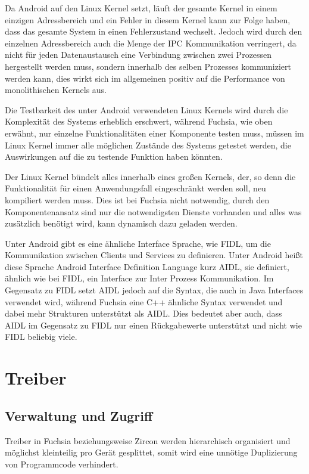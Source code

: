 \documentclass[a4paper]{scrartcl}
\begin{document}
Da Android auf den Linux Kernel setzt, läuft der gesamte Kernel in einem einzigen Adressbereich und ein Fehler in diesem Kernel kann zur Folge haben, dass das gesamte System in einen Fehlerzustand wechselt. Jedoch wird durch den einzelnen Adressbereich auch die Menge der IPC Kommunikation verringert, da nicht für jeden Datenaustausch eine Verbindung zwischen zwei Prozessen hergestellt werden muss, sondern innerhalb des selben Prozesses kommuniziert werden kann, dies wirkt sich im allgemeinen positiv auf die Performance von monolithischen Kernels aus.

Die Testbarkeit des unter Android verwendeten Linux Kernels wird durch die Komplexität des Systems erheblich erschwert, während Fuchsia, wie oben erwähnt, nur einzelne Funktionalitäten einer Komponente testen muss, müssen im Linux Kernel immer alle möglichen Zustände des Systems getestet werden, die Auswirkungen auf die zu testende Funktion haben könnten.

Der Linux Kernel bündelt alles innerhalb eines großen Kernels, der, so denn die Funktionalität für einen Anwendungsfall eingeschränkt werden soll, neu kompiliert werden muss. Dies ist bei Fuchsia nicht notwendig, durch den Komponentenansatz sind nur die notwendigsten Dienste vorhanden und alles was zusätzlich benötigt wird, kann dynamisch dazu geladen werden.

Unter Android gibt es eine ähnliche Interface Sprache, wie FIDL, um die Kommunikation zwischen Clients und Services zu definieren. Unter Android heißt diese Sprache Android Interface Definition Language kurz AIDL, sie definiert, ähnlich wie bei FIDL, ein Interface zur Inter Prozess Kommunikation. Im Gegensatz zu FIDL setzt AIDL jedoch auf die Syntax, die auch in Java Interfaces verwendet wird, während Fuchsia eine C++ ähnliche Syntax verwendet und dabei mehr Strukturen unterstützt als AIDL. Dies bedeutet aber auch, dass AIDL im Gegensatz zu FIDL nur einen Rückgabewerte unterstützt und nicht wie FIDL beliebig viele.
\section{Treiber}
\subsection{Verwaltung und Zugriff}
Treiber in Fuchsia beziehungsweise Zircon werden hierarchisch organisiert und möglichst kleinteilig pro Gerät gesplittet, somit wird eine unnötige Duplizierung von Programmcode verhindert.
\end{document}

